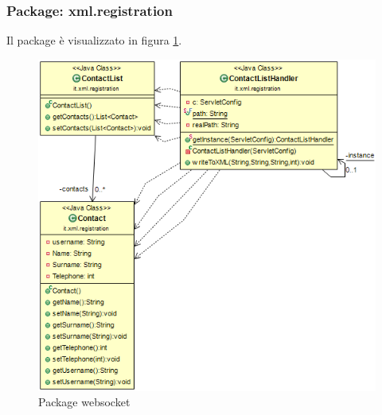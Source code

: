 \subsubsection{Package: \textbf{xml.registration}}

Il package è visualizzato in figura \ref{gfx:dependencies_xmlregistration}.

\begin{figure}[!htbp]
	\centering
	\includegraphics[scale = .5]{img/dependencies_xmlregistration}
	\caption{Package websocket}
	\label{gfx:dependencies_xmlregistration}
\end{figure}